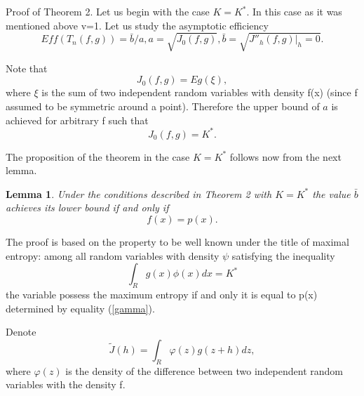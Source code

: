 \documentclass[final,11pt,3p]{elsarticle}
\newtheorem{lemma}{Lemma}
\begin{document}
Proof of Theorem 2.
Let us begin with the case $K=K^*.$ In this case as it was mentioned above v=1.
Let us study the asymptotic efficiency
$$
Eff(T_n(f,g))=\bar b/a,
a=\sqrt{J_0(f,g)},\bar b =\sqrt{J{''}_h(f,g)|_h=0}.
$$

Note that
$$
J_0(f,g)= E g(\xi),
$$
where $\xi$ is the sum of two independent random variables with density f(x) (since f assumed to be symmetric around a point).
Therefore  the upper bound of $a$ is achieved for arbitrary f such that
$$
J_0(f,g)=K^*.
$$
   
The proposition of the theorem in the case $K=K^*$ follows now from the next lemma.
\begin{lemma} Under the conditions described in Theorem 2 with $K=K^*$ the value $\bar b$ achieves its lower bound if and only if
\begin{equation}\label{opt}
f(x)= p(x).
\end{equation}
\end{lemma}
 
The proof is based on the  property to be well known under the title of maximal entropy: among all random variables with density $\psi$ satisfying the inequality
\begin {equation}\label{Class1}
\int_R g(x) \phi(x)dx =K^*
\end{equation}
the variable  possess the maximum entropy if and only it is equal to p(x) determined by equality (\ref{gamma}).

Denote 
$$
\tilde J(h)=\int_R \varphi (z) g(z+h) dz,
$$
where $\varphi(z)$ is the density of the difference between  two independent random variables with the density f. 
\end{document}
